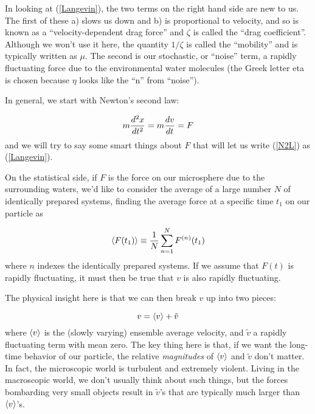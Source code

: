 \documentclass[12pt]{article}
\begin{document}
In looking at (\ref{Langevin}), the two terms on the right hand side
are new to us. The first of these a) slows us down and b) is
proportional to velocity, and so is known as a ``velocity-dependent
drag force'' and $\zeta$ is called the ``drag coefficient''. Although
we won't use it here, the quantity $1/\zeta$ is called the
``mobility'' and is typically written as $\mu$.
The second is our stochastic, or ``noise'' term, a rapidly fluctuating
force due to the environmental water molecules (the Greek letter eta
is chosen because $\eta$ looks like the ``n'' from ``noise'').

In general, we start with Newton's second law:

\begin{equation}
  \label{N2L} 
  m\frac{d^2 x}{d t^2} = m\frac{d v}{d t} = F
\end{equation}
and we will try to say some smart things about $F$ that will let us
write (\ref{N2L}) as (\ref{Langevin}).

On the statistical side, if $F$ is the force on our microsphere due to
the surrounding waters, we'd like to consider the average of a large
number $N$ of identically prepared systems, finding the average force
at a specific time $t_1$ on our particle as

\begin{equation}
  \left< F(t_1)\right> \equiv \frac{1}{N}\sum_{n=1}^NF^{(n)}(t_1)
\end{equation}
where $n$ indexes the identically prepared systems. If we assume that
$F(t)$ is rapidly fluctuating, it must then be true that $v$ is also
rapidly fluctuating. 

The physical insight here is that we can then break $v$ up into two pieces:

\begin{equation}
  \label{vphysicalinsight}
  v = \left< v\right> + \tilde{v}
\end{equation}
where $\left< v\right>$ is the (slowly varying) ensemble average velocity, and
$\tilde{v}$ a rapidly fluctuating term with mean zero. The key thing
here is that, if we want the long-time behavior of our particle, the
relative \textit{magnitudes} of $\left< v\right>$ and $\tilde{v}$ don't
matter. In fact, the microscopic world is turbulent and extremely
violent. Living in the macroscopic world, we don't usually think about
such things, but the forces bombarding very small objects result in
$\tilde{v}$'s that are typically much larger than $\left< v\right>$'s.
\end{document}
